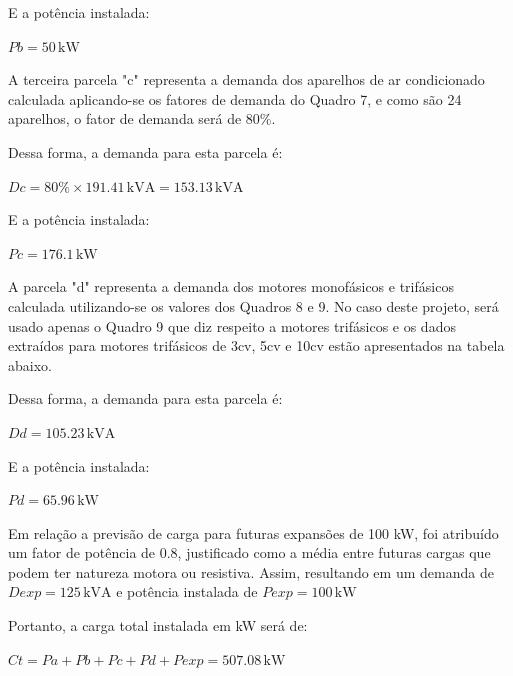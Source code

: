 E a potência instalada:

\begin{center}
    $Pb = 50 \, \text{kW}$
\end{center}

A terceira parcela "c" representa a demanda dos aparelhos de ar condicionado calculada
aplicando-se os fatores de demanda do Quadro 7, e como são 24 aparelhos, o fator de demanda será de 80\%. 



Dessa forma, a demanda para esta parcela é:

\begin{center}
    $Dc = 80\% \times 191.41 \, \text{kVA} = 153.13 \, \text{kVA}$
\end{center}

E a potência instalada:

\begin{center}
    $Pc = 176.1 \, \text{kW}$
\end{center}

A parcela "d" representa a demanda dos motores monofásicos e trifásicos calculada utilizando-se os valores dos Quadros 8 e 9. No caso deste projeto, será usado apenas o Quadro 9 que diz respeito a motores trifásicos e os dados extraídos para motores trifásicos de 3cv, 5cv e 10cv estão apresentados na tabela abaixo.



Dessa forma, a demanda para esta parcela é:

\begin{center}
    $Dd = 105.23 \, \text{kVA}$
\end{center}

E a potência instalada:

\begin{center}
    $Pd = 65.96 \, \text{kW}$
\end{center}

Em relação a previsão de carga para futuras expansões de 100 kW, foi atribuído um fator de potência de 0.8, justificado como a média entre futuras cargas que podem ter natureza motora ou resistiva. Assim, resultando em um demanda de $Dexp = 125 \, \text{kVA}$ e potência instalada de $Pexp = 100 \, \text{kW}$

Portanto, a carga total instalada em kW será de:

\begin{center}
    $Ct = Pa + Pb + Pc + Pd + Pexp = 507.08 \, \text{kW}$
\end{center}

